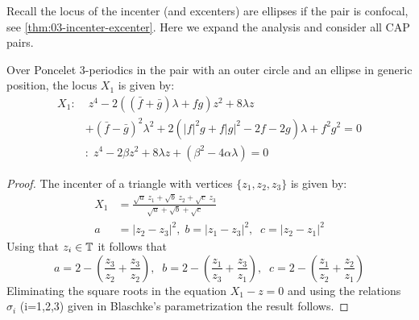 Recall the locus of the incenter (and excenters) are ellipses if the pair is confocal, see \cref{thm:03-incenter-excenter}. Here we expand the analysis and consider all CAP pairs.

\begin{proposition}\label{prop:04-X1c}
Over Poncelet 3-periodics in the pair with an outer circle and an ellipse in generic position, the locus $X_1$ is given by:
\begin{align*}
  X_1:&\;z^4 - 2(( \bar{f} + \bar{g}) \lambda +  f g) z^2 + 8   \lambda z\\
  &+ (\bar{f} - \bar{g})^2 \lambda^2 +2 (  |f|^2 g +   f |g|^2 - 2 f - 2 g) \lambda + f^2 g^2=0\\
  \;&:\;  z^4 - 2\beta  z^2+ 8\lambda z+  (\beta^2-4\alpha\lambda) =0
\end{align*}
\end{proposition}

\begin{proof} The incenter of a triangle with vertices $\{z_1,z_2,z_3\}$ is given by:
\begin{align*}
    X_1&=\frac{\sqrt{a}\;z_1+\sqrt{b}\;z_2+\sqrt{c}\;z_3}{\sqrt{a}+\sqrt{b}+\sqrt{c}}\\
    a&=|z_2-z_3|^2, \; b=|z_1-z_3|^2, \;\; c=|z_2-z_1|^2
\end{align*}
Using that $z_i\in \mathbb{T}$ it follows that
\[a=2-(\frac{z_3}{z_2}+\frac{z_3}{z_2}),\;\; b=2-(\frac{z_1}{z_3}+\frac{z_3}{z_1}),\;\;c=2-(\frac{z_1}{z_2}+\frac{z_2}{z_1})\]
Eliminating the square roots in  the equation $X_1-z=0$ and using the relations  $\sigma_i$ (i=1,2,3) given in Blaschke's parametrization the result follows.
\end{proof}

